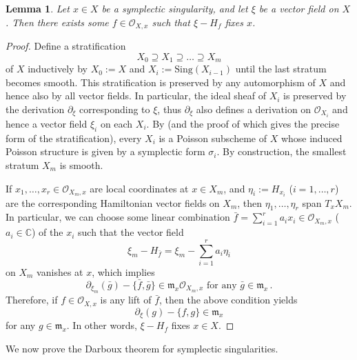 \documentclass[12pt]{amsart}
\newtheorem{lem}[prop]{Lemma}
\theoremstyle{definition}
\newcommand{\bC}{\mathbb{C}}
\newcommand{\cO}{\mathcal{O}}
\newcommand{\fm}{\mathfrak{m}}
\numberwithin{equation}{section}
\begin{document}
\begin{lem} \label{lem:Poicare}
Let $x\in X$ be a symplectic singularity, and let $\xi$ be a vector field on $X$. Then there exists some $f\in \cO_{X,x}$ such that $\xi-H_f$ fixes $x$.
\end{lem}

\begin{proof}
Define a stratification $$X_0\supseteq X_1\supseteq \dots\supseteq X_m$$ of $X$ inductively by $X_0:=X$ and $X_i:=\mathrm{Sing}(X_{i-1})$ until the last stratum becomes smooth. This stratification is preserved by any automorphism of $X$ and hence also by all vector fields. In particular, the ideal sheaf of $X_i$ is preserved by the derivation $\partial_\xi$ corresponding to $\xi$, thus $\partial_\xi$ also defines a derivation on $\cO_{X_i}$ and hence a vector field $\xi_i$ on each $X_i$. By \cite[Theorem 2.3]{Kaledin-sym} (and the proof of \cite[Proposition 3.1]{Kaledin-sym} which gives the precise form of the stratification), every $X_i$ is a Poisson subscheme of $X$ whose induced Poisson structure is given by a symplectic form $\sigma_i$. By construction, the smallest stratum $X_m$ is smooth. 

If $x_1,\dots,x_r \in \cO_{X_m,x}$ are local coordinates at $x\in X_m$, and $\eta_i:=H_{x_i}$ ($i=1,\dots,r$) are the corresponding Hamiltonian vector fields on $X_m$, then $\eta_1,\dots,\eta_r$ span $T_x X_m$. In particular, we can choose some linear combination $\bar{f}=\sum_{i=1}^r a_i x_i \in \cO_{X_m,x}$ ($a_i\in \bC$) of the $x_i$ such that the vector field
\[
\xi_m-H_{\bar{f}} = \xi_m - \sum_{i=1}^r a_i\eta_i
\]
on $X_m$ vanishes at $x$, which implies 
\[
\partial_{\xi_m}(\bar{g})-\{\bar{f},\bar{g}\}\in \fm_x \cO_{X_m,x}\mbox{\ \ for any $\bar{g}\in \fm_x$}\, . 
\]
Therefore, if $f\in\cO_{X,x}$ is any lift of $\bar{f}$, then the above condition yields 
\[
\partial_\xi(g) - \{f,g\}\in \fm_x
\]
for any $g\in \fm_x$. In other words, $\xi-H_f$ fixes $x\in X$.
\end{proof}

We now prove the Darboux theorem for symplectic singularities.
\end{document}
